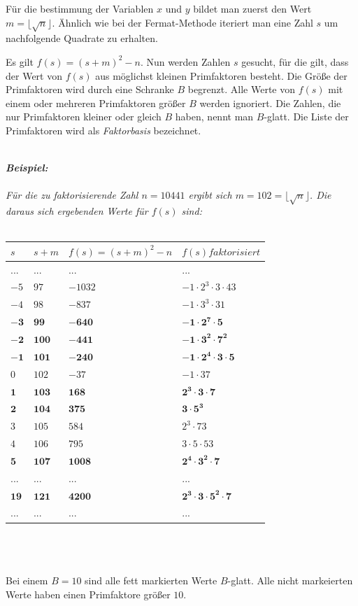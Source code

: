 \documentclass[10pt, bigheadings]{scrartcl}
\begin{document}
Für die bestimmung der Variablen $x$ und $y$ bildet man zuerst den Wert
$m=\lfloor\sqrt{n}\rfloor$. Ähnlich wie bei der Fermat-Methode iteriert
man eine Zahl $s$ um nachfolgende Quadrate zu erhalten.

Es gilt $f(s) = (s+m)^2 - n$. Nun werden Zahlen $s$ gesucht, für die gilt,
dass der Wert von $f(s)$ aus möglichst kleinen Primfaktoren besteht. Die
Größe der Primfaktoren wird durch eine Schranke $B$ begrenzt.
Alle Werte von $f(s)$ mit einem oder mehreren Primfaktoren größer $B$
werden ignoriert. Die Zahlen, die nur Primfaktoren kleiner oder gleich
$B$ haben, nennt man $B$-glatt. Die Liste der Primfaktoren wird als
\textit{Faktorbasis} bezeichnet.\\\\
{\it
\textbf{Beispiel:}\\\\
Für die zu faktorisierende Zahl $n=10441$ ergibt sich
$m= 102 = \lfloor\sqrt{n}\rfloor$. Die daraus sich ergebenden Werte
für $f(s)$ sind:\\\\

\begin{tabular}{|l|l|l|l|}
\hline
$s$ & $s+m$ & $f(s)=(s+m)^2-n$ & $f(s) faktorisiert$\\
\hline
... & ... & ... & ... \\
\hline
 $-5$ & $97$ & $-1032$ & $-1\cdot2^3\cdot3\cdot43$\\
 \hline
 $-4$ & $98$ & $-837$ &  $-1\cdot3^3\cdot31$\\
 \hline
 $\mathbf{-3}$ & $\mathbf{99}$ &  $\mathbf{-640}$ & $\mathbf{-1\cdot2^7\cdot5}$\\
 \hline
 $\mathbf{-2}$ & $\mathbf{100}$ & $\mathbf{-441}$ & $\mathbf{-1\cdot3^2\cdot7^2}$\\
 \hline
 $\mathbf{-1}$ & $\mathbf{101}$ & $\mathbf{-240}$ & $\mathbf{-1\cdot2^4\cdot3\cdot5}$\\
 \hline
$0$ & $102$ & $-37$ & $-1\cdot37$\\
 \hline
 $\mathbf{1}$ & $\mathbf{103}$ & $\mathbf{168}$ & $\mathbf{2^3\cdot3\cdot7}$\\
 \hline
 $\mathbf{2}$ & $\mathbf{104}$ & $\mathbf{375}$ & $\mathbf{3\cdot5^3}$\\
 \hline
 $3$ & $105$ & $584$ & $2^3\cdot73$\\
 \hline
 $4$ & $106$ & $795$ & $3\cdot5\cdot53$\\
 \hline
 $\mathbf{5}$ & $\mathbf{107}$ & $\mathbf{1008}$ & $\mathbf{2^4\cdot3^2\cdot7}$\\
 \hline
 ... & ... & ... & ...\\
\hline
$\mathbf{19}$ & $\mathbf{121}$ & $\mathbf{4200}$ & $\mathbf{2^3\cdot3\cdot5^2\cdot7}$\\
 \hline
 ... & ... & ... & ...\\
 \hline
\end{tabular}\\\\\\
Bei einem $B=10$ sind alle fett markierten Werte $B$-glatt. Alle nicht
markeierten Werte haben einen Primfaktore größer $10$.
}\\\\
\end{document}
